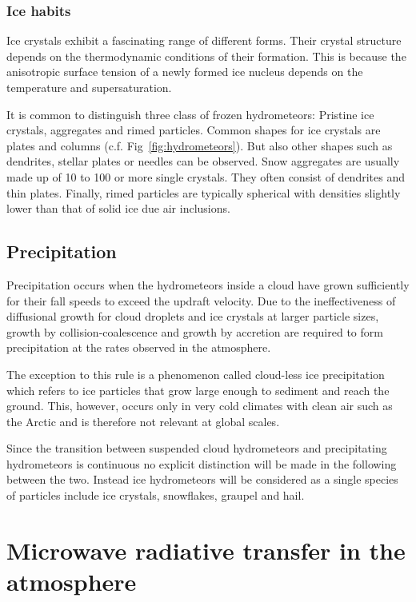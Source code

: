 \subsection{Ice habits}

Ice crystals exhibit a fascinating range of different forms. Their crystal
structure depends on the thermodynamic conditions of their formation. This is
because the anisotropic surface tension of a newly formed ice nucleus depends
 on the temperature and supersaturation.

 It is common to distinguish three class of frozen hydrometeors: Pristine ice
 crystals, aggregates and rimed particles. Common shapes for ice crystals are
 plates and columns (c.f. Fig~\ref{fig:hydrometeors}). But also other shapes such as
 dendrites, stellar plates or needles can be observed. Snow aggregates are
 usually made up of 10 to 100 or more single crystals. They often consist of
 dendrites and thin plates. Finally, rimed particles are typically spherical
 with densities slightly lower than that of solid ice due air inclusions.

\section{Precipitation}

Precipitation occurs when the hydrometeors inside a cloud have grown
sufficiently for their fall speeds to exceed the updraft velocity. Due to the
ineffectiveness of diffusional growth for cloud droplets and ice crystals at
larger particle sizes, growth by collision-coalescence and growth by accretion
are required to form precipitation at the rates observed in the atmosphere.

The exception to this rule is a phenomenon called cloud-less ice precipitation
which refers to ice particles that grow large enough to sediment and reach
the ground. This, however, occurs only in very cold climates with clean air such
as the Arctic and is therefore not relevant at global scales.

Since the transition between suspended cloud hydrometeors and precipitating
hydrometeors is continuous no explicit distinction will be made in the following
between the two. Instead ice hydrometeors will be considered as a single species
of particles include ice crystals, snowflakes, graupel and hail.

\chapter{Microwave radiative transfer in the atmosphere}
\label{ch:radiative_transfer}


